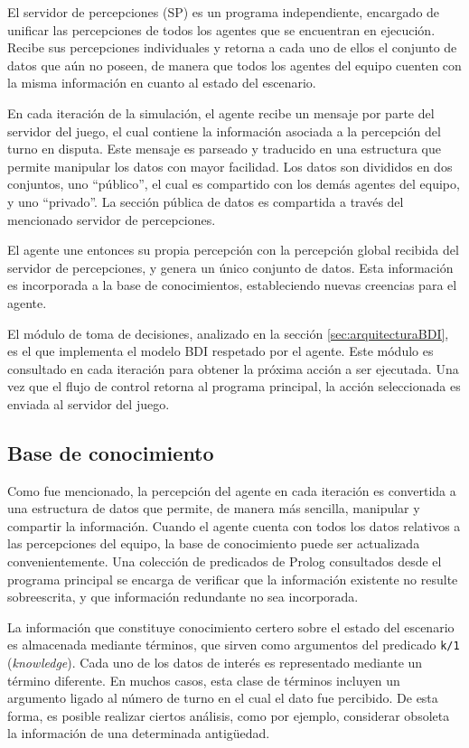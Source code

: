 \documentclass[oneside]{book}
\theoremstyle{definition}
\begin{document}
El servidor de percepciones (SP) es un programa independiente, encargado de unificar las 
percepciones de todos los agentes que se encuentran en ejecución. Recibe sus percepciones 
individuales y retorna a cada uno de ellos el conjunto de datos que aún no poseen, de 
manera que todos los agentes del equipo cuenten con la misma información en cuanto al estado 
del escenario.

En cada iteración de la simulación, el agente recibe un mensaje por parte del servidor 
del juego, el cual contiene la información asociada a la percepción del turno en disputa. 
Este mensaje es parseado y traducido en una estructura que permite manipular los datos 
con mayor facilidad. Los datos son divididos en dos conjuntos, uno ``público'', el cual 
es compartido con los demás agentes del equipo, y uno ``privado''. La sección pública de 
datos es compartida a través del mencionado servidor de percepciones.

El agente une entonces su propia percepción con la percepción global recibida del servidor 
de percepciones, y genera un único conjunto de datos. Esta información es incorporada a la 
base de conocimientos, estableciendo nuevas creencias para el agente.

El módulo de toma de decisiones, analizado en la sección \ref{sec:arquitecturaBDI}, es el 
que implementa el modelo BDI respetado por el agente. Este módulo es consultado en cada 
iteración para obtener la próxima acción a ser ejecutada. Una vez que el flujo de control 
retorna al programa principal, la acción seleccionada es enviada al servidor del juego.

\subsection{Base de conocimiento}


Como fue mencionado, la percepción del agente en cada iteración es convertida a una 
estructura de datos que permite, de manera más sencilla, manipular y compartir la 
información. Cuando el agente cuenta con todos los datos relativos a las percepciones 
del equipo, la base de conocimiento puede ser actualizada convenientemente. Una colección 
de predicados de Prolog consultados desde el programa principal se encarga de verificar 
que la información existente no resulte sobreescrita, y que información redundante no sea 
incorporada. 

La información que constituye conocimiento certero sobre el estado del escenario es 
almacenada mediante términos, que sirven como argumentos del predicado \texttt{k/1} 
(\textit{knowledge}). Cada uno de los datos de interés es representado mediante un 
término diferente. 
En muchos casos, esta clase de términos incluyen un argumento ligado al número de turno 
en el cual el dato fue percibido. De esta forma, es posible realizar ciertos análisis, 
como por ejemplo, considerar obsoleta la información de una determinada antigüedad.
\end{document}

